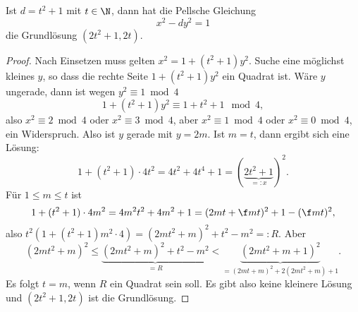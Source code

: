 \begin{st} \label{4.23}
	Ist $d = t^2 + 1$ mit $t \in \N$, dann hat die Pellsche Gleichung
	\[
		x^2 - dy^2 = 1
	\]
	die Grundlösung $(2t^2 + 1, 2t)$.
	\begin{proof}
		Nach Einsetzen muss gelten $x^2 = 1 + (t^2 + 1)y^2$.
		Suche eine möglichst kleines $y$, so dass die rechte Seite $1 + (t^2 + 1)y^2$ ein Quadrat ist.
		Wäre $y$ ungerade, dann ist wegen $y^2 \equiv 1 \bmod 4$
		\[
			1 + (t^2 + 1)y^2
			\equiv 1 + t^2 + 1 \mod 4,
		\]
		also $x^2 \equiv 2 \bmod 4$ oder $x^2 \equiv 3 \bmod 4$, aber $x^2 \equiv 1 \bmod 4$ oder $x^2 \equiv 0 \bmod 4$, ein Widerspruch.
		Also ist $y$ gerade mit $y = 2m$.
		Ist $m = t$, dann ergibt sich eine Lösung:
		\[
			1 + (t^2 + 1)\cdot 4t^2
			= 4t^2 + 4t^4 + 1
			= (\underbrace{2t^2 + 1}_{=:x})^2.
		\]
		Für $1 \le m \le t$ ist
		\[
			1 + (t^2 + 1)\cdot 4m^2
			= 4m^2 t^2 + 4m^2 + 1
			= (2mt + \f mt)^2 + 1 - (\f mt)^2,
		\]
		also $t^2(1 + (t^2 + 1)m^2\cdot 4) = (2mt^2 + m)^2 + t^2 - m^2 =: R$.
		Aber
		\[
			(2mt^2 + m)^2
			\le \underbrace{(2mt^2 + m)^2 + t^2 - m^2}_{=R}
			< \underbrace{(2mt^2 + m + 1)^2}_{= (2mt + m)^2 + 2(2mt^2 + m) + 1}.
		\]
		Es folgt $t = m$, wenn $R$ ein Quadrat sein soll.
		Es gibt also keine kleinere Lösung und $(2t^2 + 1, 2t)$ ist die Grundlösung.
	\end{proof}
\end{st}
